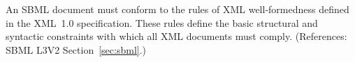 An SBML document must conform to the rules of XML well-formedness defined
in the XML~1.0 specification.  These rules define the basic structural and
syntactic constraints with which all XML documents must comply.
(References: SBML L3V2 Section~\ref{sec:sbml}.)
